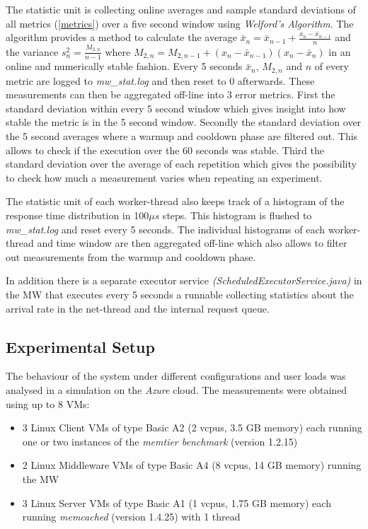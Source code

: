 \documentclass[report.tex]{subfiles}
\begin{document}
The statistic unit is collecting online averages and sample standard deviations of all metrics (\ref{metrics}) over a five second window using \emph{Welford's Algorithm}.\cite{Knuth:1997:ACP:270146} 
The algorithm provides a method to calculate the average $\bar{x}_n = \bar{x}_{n-1} + \frac{x_n -\bar{x}_{n-1}}{n}$ and the variance $s^2_n = \frac{M_{2,n}}{n-1}$ where $M_{2,n} = M_{2,n-1} + (x_n - \bar{x}_{n-1})(x_n - \bar{x}_n)$ in an online and numerically stable fashion.
Every 5 seconds $\bar{x}_n$, $M_{2,n}$ and $n$ of every metric are logged to \emph{mw\_stat.log} and then reset to 0 afterwards. These measurements can then be aggregated off-line into 3 error metrics. First the standard deviation within every 5 second window which gives insight into how stable the metric is in the 5 second window. Secondly the standard deviation over the 5 second averages where a warmup and cooldown phase are filtered out. This allows to check if the execution over the 60 seconds was stable. Third the standard deviation over the average of each repetition which gives the possibility to check how much a measurement varies when repeating an experiment.

The statistic unit of each worker-thread also keeps track of a histogram of the response time distribution in 100$\mu s$ steps. This histogram is flushed to \emph{mw\_stat.log} and reset every 5 seconds. The individual histograms of each worker-thread and time window are then aggregated off-line which also allows to filter out measurements from the warmup and cooldown phase.

In addition there is a separate executor service \emph{(ScheduledExecutorService.java)} in the MW that executes every 5 seconds a runnable collecting statistics about the arrival rate in the net-thread and the internal request queue. 

\subsection{Experimental Setup}

The behaviour of the system under different configurations and user loads was analysed in a simulation on the \emph{Azure} cloud.
The measurements were obtained using up to 8 VMs:
\begin{itemize}
	\vitemsep
	\item 3 Linux Client VMs of type Basic A2 (2 vcpus, 3.5 GB memory) each running one or two instances of the \emph{memtier benchmark} (version 1.2.15)
	\item 2 Linux Middleware VMs of type Basic A4 (8 vcpus, 14 GB memory) running the MW
	\item 3 Linux Server VMs of type Basic A1 (1 vcpus, 1.75 GB memory) each running \emph{memcached} (version 1.4.25) with 1 thread
\end{itemize}
\end{document}
